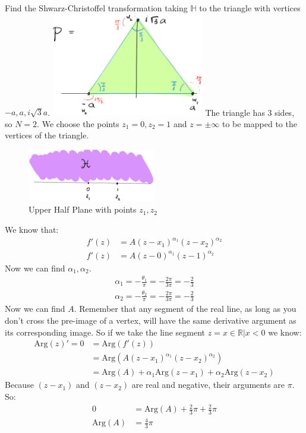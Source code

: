 \begin{example}
    Find the Shwarz-Christoffel transformation taking $\mathbb{H}$ to the triangle with vertices $-a, a, i\sqrt{3}a$.
    \includegraphics[width=0.5\textwidth]{LECTURE_17/graph10.png}
    The triangle has 3 sides, so $N = 2$. We choose the points $z_1 = 0, z_2 = 1$ and $z = \pm \infty$ to be mapped to the vertices of the triangle.\\
    \begin{figure}[H]
        \centering
        \includegraphics[width=0.5\textwidth]{LECTURE_17/graph11.png}
        \caption{Upper Half Plane with points $z_1, z_2$}
    \end{figure}
    We know that:
    \begin{align*}
        f'(z) & = A(z - x_1)^{\alpha_1}(z - x_2)^{\alpha_2} \\
        f'(z) & = A(z - 0)^{\alpha_1}(z - 1)^{\alpha_2}
    \end{align*}
    Now we can find $\alpha_1, \alpha_2$.
    \begin{align*}
        \alpha_1 = -\frac{\theta_1}{\pi} = -\frac{2\pi}{3\pi} = -\frac{2}{3} \\
        \alpha_2 = -\frac{\theta_2}{\pi} = -\frac{2\pi}{3\pi} = -\frac{2}{3}
    \end{align*}
    Now we can find $A$. Remember that any segment of the real line, as long as you don't cross the pre-image of a vertex, will have the same derivative argument as its corresponding image. So if we take the line segment $z = x \in \mathbb{R} | x < 0$ we know:
    \begin{align*}
        \text{Arg} (z)' = 0 & = \text{Arg} (f'(z))                                                        \\
                            & = \text{Arg}(A(z - x_1)^{\alpha_1}(z - x_2)^{\alpha_2})                     \\
                            & = \text{Arg}(A) + \alpha_1\text{Arg}(z - x_1) + \alpha_2\text{Arg}(z - x_2)
    \end{align*}
    Because $(z - x_1)$ and $(z - x_2)$ are real and negative, their arguments are $\pi$. So:
    \begin{align*}
        0             & = \text{Arg}(A) + \frac{2}{3}\pi + \frac{2}{3}\pi \\
        \text{Arg}(A) & = \frac{4}{3}\pi
    \end{align*}


\end{example}
